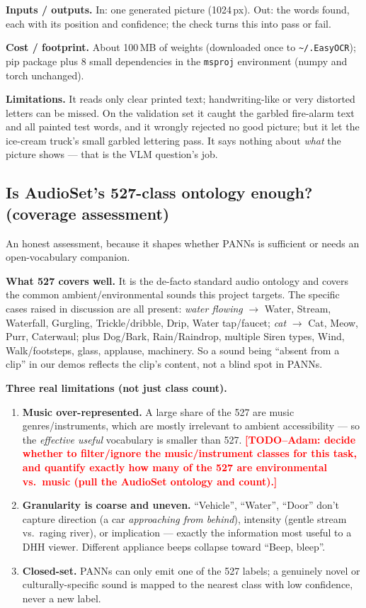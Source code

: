 \documentclass[11pt,a4paper]{article}
\newcommand{\TODO}[1]{\textcolor{red}{\textbf{[TODO--Adam: #1]}}}
\begin{document}
\textbf{Inputs / outputs.} In: one generated picture (1024\,px). Out: the words found, each with its
position and confidence; the check turns this into pass or fail.

\textbf{Cost / footprint.} About 100\,MB of weights (downloaded once to \texttt{\textasciitilde/.EasyOCR});
pip package plus 8 small dependencies in the \texttt{msproj} environment (numpy and torch unchanged).

\textbf{Limitations.} It reads only clear printed text; handwriting-like or very distorted letters can
be missed. On the validation set it caught the garbled fire-alarm text and all painted test words, and
it wrongly rejected no good picture; but it let the ice-cream truck's small garbled lettering pass. It says nothing about \emph{what} the picture shows --- that is the VLM question's job.

\subsection{Is AudioSet's 527-class ontology enough? (coverage assessment)}\label{sec:coverage}
An honest assessment, because it shapes whether PANNs is sufficient or needs an open-vocabulary
companion.

\textbf{What 527 covers well.} It is the de-facto standard audio ontology and covers the common
ambient/environmental sounds this project targets. The specific cases raised in discussion are all
present: \emph{water flowing} $\rightarrow$ Water, Stream, Waterfall, Gurgling, Trickle/dribble,
Drip, Water tap/faucet; \emph{cat} $\rightarrow$ Cat, Meow, Purr, Caterwaul; plus Dog/Bark,
Rain/Raindrop, multiple Siren types, Wind, Walk/footsteps, glass, applause, machinery. So a sound
being ``absent from a clip'' in our demos reflects the clip's content, not a blind spot in PANNs.

\textbf{Three real limitations (not just class count).}
\begin{enumerate}
  \item \textbf{Music over-represented.} A large share of the 527 are music genres/instruments, which
    are mostly irrelevant to ambient accessibility --- so the \emph{effective useful} vocabulary is
    smaller than 527. \TODO{decide whether to filter/ignore the music/instrument classes for this
    task, and quantify exactly how many of the 527 are environmental vs.\ music (pull the AudioSet
    ontology and count).}
  \item \textbf{Granularity is coarse and uneven.} ``Vehicle'', ``Water'', ``Door'' don't capture
    direction (a car \emph{approaching from behind}), intensity (gentle stream vs.\ raging river), or
    implication --- exactly the information most useful to a DHH viewer. Different appliance beeps
    collapse toward ``Beep, bleep''.
  \item \textbf{Closed-set.} PANNs can only emit one of the 527 labels; a genuinely novel or
    culturally-specific sound is mapped to the nearest class with low confidence, never a new label.
\end{enumerate}
\end{document}
